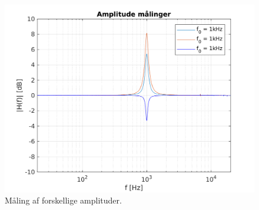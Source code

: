 
\begin{figure}[h!]
\centering
\includegraphics[scale = 0.8]{matlabdemo/test/test_amp.png}
\caption{Måling af forskellige amplituder.}
\label{fig:eq_amp}
\end{figure}


%






